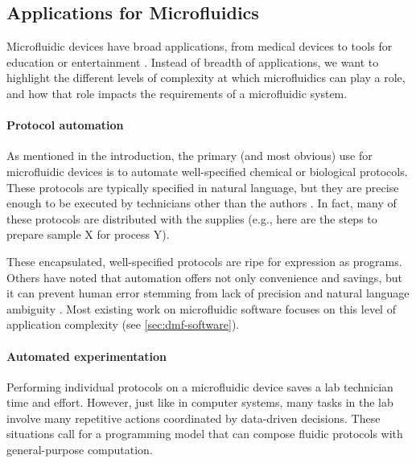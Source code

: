 \documentclass[sigplan, screen]{acmart}
\begin{document}
\subsection{Applications for Microfluidics}
Microfluidic devices have broad applications, from medical devices \cite{coelho2017digital} to tools for education or entertainment \cite{opendrop, mit-medialab}.
Instead of breadth of applications, we want to highlight the different levels of complexity at which microfluidics can play a role, and how that role impacts the requirements of a microfluidic system.

\paragraph{Protocol automation}
As mentioned in the introduction, the primary (and most obvious) use for microfluidic devices is to automate well-specified chemical or biological protocols.
These protocols are typically specified in natural language, but they are precise enough to be executed by technicians other than the authors \cite{aquarium}.
In fact, many of these protocols are distributed with the supplies (e.g., here are the steps to prepare sample X for process Y).

These encapsulated, well-specified protocols are ripe for expression as programs.
Others have noted that automation offers not only convenience and savings, but it can prevent human error stemming from lack of precision and natural language ambiguity \cite{antha-qbd}.
Most existing work on microfluidic software focuses on this level of application complexity (see \autoref{sec:dmf-software}).


\paragraph{Automated experimentation}

Performing individual protocols on a microfluidic device saves a lab technician time and effort.
However, just like in computer systems, many tasks in the lab involve many repetitive actions coordinated by data-driven decisions.
These situations call for a programming model that can compose fluidic protocols with general-purpose computation.
\end{document}
